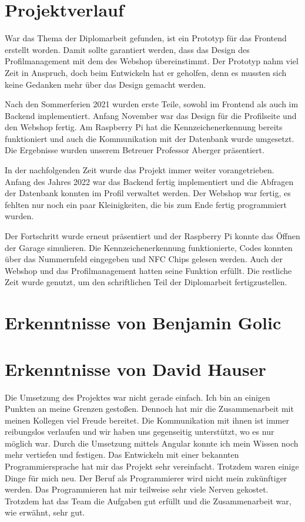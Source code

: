 \section{Projektverlauf}
War das Thema der Diplomarbeit gefunden, ist ein Prototyp für das Frontend erstellt worden. Damit sollte garantiert werden, dass das Design des Profilmanagement mit dem des Webshop übereinstimmt. Der Prototyp nahm viel Zeit in Anspruch, doch beim Entwickeln hat er geholfen, denn es mussten sich keine Gedanken mehr über das Design gemacht werden.

Nach den Sommerferien 2021 wurden erste Teile, sowohl im Frontend als auch im Backend implementiert. Anfang November war das Design für die Profilseite und den Webshop fertig. Am Raspberry Pi hat die Kennzeichenerkennung bereits funktioniert und auch die Kommunikation mit der Datenbank wurde umgesetzt. Die Ergebnisse wurden unserem Betreuer Professor Aberger präsentiert.

In der nachfolgenden Zeit wurde das Projekt immer weiter vorangetrieben.  Anfang des Jahres 2022 war das Backend fertig implementiert und die Abfragen der Datenbank konnten im Profil verwaltet werden. Der Webshop war fertig, es fehlten nur noch ein paar Kleinigkeiten, die bis zum Ende fertig programmiert wurden. 

Der Fortschritt wurde erneut präsentiert und der Raspberry Pi konnte das Öffnen der Garage simulieren. Die Kennzeichenerkennung funktionierte, Codes konnten über das Nummernfeld eingegeben und NFC Chips gelesen werden. Auch der Webshop und das Profilmanagement hatten seine Funktion erfüllt. Die restliche Zeit wurde genutzt, um den schriftlichen Teil der Diplomarbeit fertigzustellen. 


\section{Erkenntnisse von Benjamin Golic}

\section{Erkenntnisse von David Hauser}
Die Umsetzung des Projektes war nicht gerade einfach. Ich bin an einigen Punkten an meine Grenzen gestoßen. Dennoch hat mir die Zusammenarbeit mit meinen Kollegen viel Freude bereitet. Die Kommunikation mit ihnen ist immer reibungslos verlaufen und wir haben uns gegenseitig unterstützt, wo es nur möglich war.
Durch die Umsetzung mittels Angular konnte ich mein Wissen noch mehr vertiefen und festigen. Das Entwickeln mit einer bekannten Programmiersprache hat mir das Projekt sehr vereinfacht. Trotzdem waren einige Dinge für mich neu.
Der Beruf als Programmierer wird nicht mein zukünftiger werden. Das Programmieren hat mir teilweise sehr viele Nerven gekostet. Trotzdem hat das Team die Aufgaben gut erfüllt und die Zusammenarbeit war, wie erwähnt, sehr gut.

